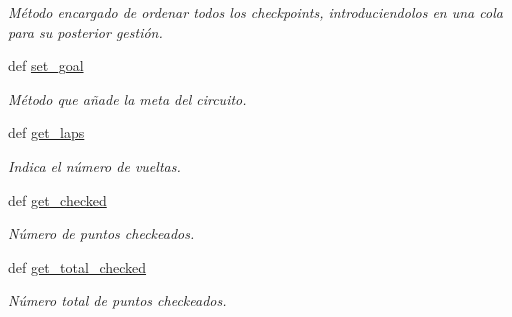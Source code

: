 \begin{DoxyCompactItemize}
\begin{DoxyCompactList}\small\item\em \-Método encargado de ordenar todos los checkpoints, introduciendolos en una cola para su posterior gestión. \end{DoxyCompactList}\item 
def \hyperlink{classengine_1_1checkpoint_1_1CheckPoints_af9ef2abb990dfe299933dd18399c671b}{set\-\_\-goal}
\begin{DoxyCompactList}\small\item\em \-Método que añade la meta del circuito. \end{DoxyCompactList}\item 
def \hyperlink{classengine_1_1checkpoint_1_1CheckPoints_adbfda9348f8442b04aa042b07bc994d1}{get\-\_\-laps}
\begin{DoxyCompactList}\small\item\em \-Indica el número de vueltas. \end{DoxyCompactList}\item 
def \hyperlink{classengine_1_1checkpoint_1_1CheckPoints_a2ddd9f74a25fda0acf340143e28bdaa7}{get\-\_\-checked}
\begin{DoxyCompactList}\small\item\em \-Número de puntos checkeados. \end{DoxyCompactList}\item 
def \hyperlink{classengine_1_1checkpoint_1_1CheckPoints_a179c23c1eee4863e23dabc4208cc6dfa}{get\-\_\-total\-\_\-checked}
\begin{DoxyCompactList}\small\item\em \-Número total de puntos checkeados. \end{DoxyCompactList}\end{DoxyCompactItemize}
